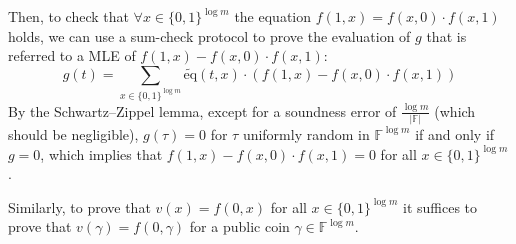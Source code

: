 \documentclass[../lecture-notes-148x210.tex]{subfiles}
\begin{document}
Then, to check that $\forall x \in \{0,1\}^{\log m}$ the equation $f(1,x) = f(x, 0) \cdot f(x, 1)$ holds, we can use 
a sum-check protocol to prove the evaluation of $g$ that is referred to a MLE of $f(1,x) - f(x, 0) \cdot f(x, 1)$:
\begin{equation*}
    g(t) = \sum_{x \in \{0,1\}^{\log m}} \widetilde{\text{eq}}(t,x) \cdot (f(1,x) - f(x, 0) \cdot f(x, 1))
\end{equation*}
By the Schwartz–Zippel lemma, except for a soundness error of $\frac{\log m}{|\mathbb{F}|}$ (which should be negligible),
 $g(\tau) = 0$ for $\tau$ uniformly random in $\mathbb{F}^{\log m}$ if and only if $g = 0$, which implies that 
 $f(1, x) - f(x, 0) \cdot f(x, 1) = 0$ for all $x \in \{0, 1\}^{\log m}$.

Similarly, to prove that $v(x) = f(0, x)$ for all $x \in \{0, 1\}^{\log m}$ it suffices to prove that $v(\gamma) = f(0, \gamma)$
 for a public coin $\gamma \in \mathbb{F}^{\log m}$.
\end{document}
